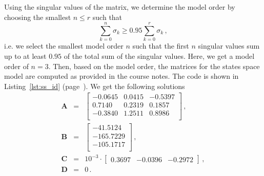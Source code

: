 \documentclass{scrartcl}
\begin{document}
Using the singular values of the matrix, we determine the model order by choosing the smallest $n \le r$ such that
\begin{equation}
	\sum\limits_{k=0}^{n}\sigma_k \ge 0.95\sum\limits_{k=0}^{r}\sigma_k\, ,
\end{equation}
i.e. we select the smallest model order $n$ such that the first $n$ singular values sum up to at least $0.95$ of the total sum of the singular values.
Here, we get a model order of $n = 3$.
Then, based on the model order, the matrices for the states space model are computed as provided in the course notes.
The code is shown in Listing~\ref{lst:ss_id} (page~\pageref{lst:ss_id}).
We get the following solutions
\begin{eqnarray}
	\mathbf{A} &=& \begin{bmatrix}
			-0.0645  & 0.0415 & -0.5397\\
			 0.7140  & 0.2319 &  0.1857\\
			-0.3840  & 1.2511 &  0.8986\\
	\end{bmatrix}\,,\\
	\mathbf{B} &=& \begin{bmatrix}
		 -41.5124\\
		-165.7229\\
		-105.1717\\
	\end{bmatrix}\,,\\
	\mathbf{C} &=& 10^{-3} \cdot \begin{bmatrix}
	    0.3697 & -0.0396 & -0.2972
	\end{bmatrix}\, ,\\
	\mathbf{D} &=& 0\, .
\end{eqnarray}
\end{document}
